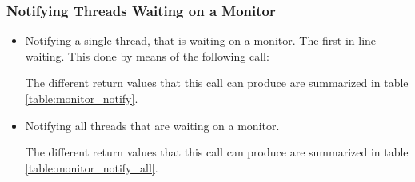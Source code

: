 
\subsubsection{Notifying Threads Waiting on a Monitor}

\begin{itemize}
\item Notifying a single thread, that is waiting on a monitor. The first in
line waiting. This done by means of the following call:


The different return values that this call can produce are summarized
in table \ref{table:monitor_notify}.  

\item Notifying all threads that are waiting on a monitor.


The different return values that this call can produce are summarized
in table \ref{table:monitor_notify_all}.
\end{itemize}


